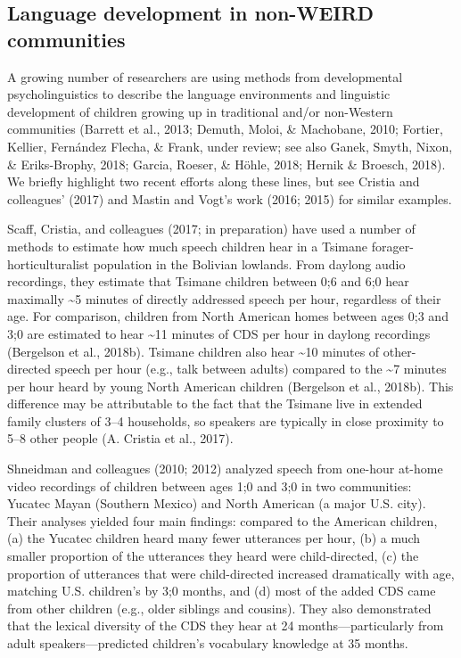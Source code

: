 \documentclass[floatsintext,man]{apa6}
\theoremstyle{definition}
\theoremstyle{definition}
\theoremstyle{definition}
\theoremstyle{remark}
\begin{document}
\subsection{Language development in non-WEIRD
communities}\label{intro-nonweird}

A growing number of researchers are using methods from developmental
psycholinguistics to describe the language environments and linguistic
development of children growing up in traditional and/or non-Western
communities (Barrett et al., 2013; Demuth, Moloi, \& Machobane, 2010;
Fortier, Kellier, Fernández Flecha, \& Frank, under review; see also
Ganek, Smyth, Nixon, \& Eriks-Brophy, 2018; Garcia, Roeser, \& Höhle,
2018; Hernik \& Broesch, 2018). We briefly highlight two recent efforts
along these lines, but see Cristia and colleagues' (2017) and Mastin and
Vogt's work (2016; 2015) for similar examples.

Scaff, Cristia, and colleagues (2017; in preparation) have used a number
of methods to estimate how much speech children hear in a Tsimane
forager-horticulturalist population in the Bolivian lowlands. From
daylong audio recordings, they estimate that Tsimane children between
0;6 and 6;0 hear maximally \textasciitilde{}5 minutes of directly
addressed speech per hour, regardless of their age. For comparison,
children from North American homes between ages 0;3 and 3;0 are
estimated to hear \textasciitilde{}11 minutes of CDS per hour in daylong
recordings (Bergelson et al., 2018b). Tsimane children also hear
\textasciitilde{}10 minutes of other-directed speech per hour (e.g.,
talk between adults) compared to the \textasciitilde{}7 minutes per hour
heard by young North American children (Bergelson et al., 2018b). This
difference may be attributable to the fact that the Tsimane live in
extended family clusters of 3--4 households, so speakers are typically
in close proximity to 5--8 other people (A. Cristia et al., 2017).

Shneidman and colleagues (2010; 2012) analyzed speech from one-hour
at-home video recordings of children between ages 1;0 and 3;0 in two
communities: Yucatec Mayan (Southern Mexico) and North American (a major
U.S. city). Their analyses yielded four main findings: compared to the
American children, (a) the Yucatec children heard many fewer utterances
per hour, (b) a much smaller proportion of the utterances they heard
were child-directed, (c) the proportion of utterances that were
child-directed increased dramatically with age, matching U.S. children's
by 3;0 months, and (d) most of the added CDS came from other children
(e.g., older siblings and cousins). They also demonstrated that the
lexical diversity of the CDS they hear at 24 months---particularly from
adult speakers---predicted children's vocabulary knowledge at 35 months.
\end{document}

